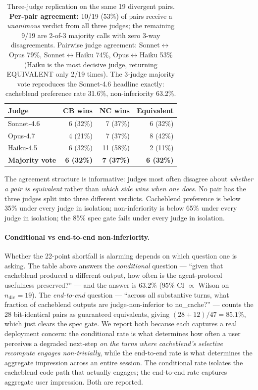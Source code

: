 \begin{table}[h]
\small
\centering
\begin{tabular}{lrrr}
\toprule
Judge & CB wins & NC wins & Equivalent \\
\midrule
Sonnet-4.6      & 6 (32\%) & 7 (37\%)  & 6 (32\%) \\
Opus-4.7        & 4 (21\%) & 7 (37\%)  & 8 (42\%) \\
Haiku-4.5       & 6 (32\%) & 11 (58\%) & 2 (11\%) \\
\midrule
\textbf{Majority vote} & \textbf{6 (32\%)} & \textbf{7 (37\%)} & \textbf{6 (32\%)} \\
\bottomrule
\end{tabular}
\caption{Three-judge replication on the same 19 divergent pairs.
\textbf{Per-pair agreement:} 10/19 (53\%) of pairs receive a
\emph{unanimous} verdict from all three judges; the remaining 9/19 are
2-of-3 majority calls with zero 3-way disagreements. Pairwise judge
agreement: Sonnet$\leftrightarrow$Opus 79\%,
Sonnet$\leftrightarrow$Haiku 74\%, Opus$\leftrightarrow$Haiku 53\%
(Haiku is the most decisive judge, returning EQUIVALENT only 2/19
times). The 3-judge majority vote reproduces the Sonnet-4.6 headline
exactly: cacheblend preference rate 31.6\%, non-inferiority 63.2\%.}
\label{tab:multi-judge}
\end{table}

The agreement structure is informative: judges most often disagree
about \emph{whether a pair is equivalent} rather than \emph{which
side wins when one does}. No pair has the three judges split into
three different verdicts. Cacheblend preference is below 35\% under
every judge in isolation; non-inferiority is below 65\% under every
judge in isolation; the 85\% spec gate fails under every judge in
isolation.

\paragraph{Conditional vs end-to-end non-inferiority.} Whether the 22-point
shortfall is alarming depends on which question one is asking. The
table above answers the \emph{conditional} question --- ``given that
cacheblend produced a different output, how often is the agent-protocol
usefulness preserved?'' --- and the answer is 63.2\%
($95\%$ CI $\propto$ Wilson on $n_{\text{div}}{=}19$). The
\emph{end-to-end} question --- ``across all substantive turns, what
fraction of cacheblend outputs are judge-non-inferior to no\_cache?''
--- counts the 28 bit-identical pairs as guaranteed equivalents, giving
$(28 + 12)/47 = 85.1\%$, which just clears the spec gate. We report
both because each captures a real deployment concern: the conditional
rate is what determines how often a user perceives a degraded next-step
\emph{on the turns where cacheblend's selective recompute engages
non-trivially}, while the end-to-end rate is what determines the
aggregate impression across an entire session. The conditional rate
isolates the cacheblend code path that actually engages; the
end-to-end rate captures aggregate user impression. Both are reported.

